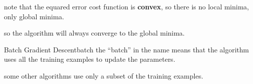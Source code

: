 \vspace{2em}
\begin{notebox}
    note that the equared error cost function is \textbf{convex}, %
    so there is no local minima, %
    only global minima.\par
    so the algorithm will always converge to the global minima.
\end{notebox}

\begin{dfnbox}{Batch Gradient Descent}{batch}
    the ``batch'' in the name means that the algorithm uses all the training examples to update the parameters.\par
    some other algorithms use only a subset of the training examples. %
\end{dfnbox}